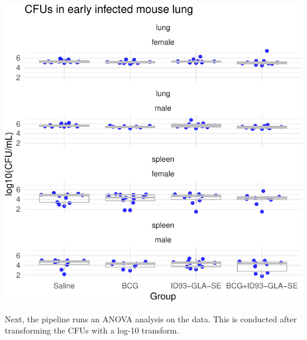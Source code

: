 \documentclass[
]{book}
\begin{document}
\includegraphics{csu-impactb_files/figure-latex/unnamed-chunk-32-1.pdf}

Next, the pipeline runs an ANOVA analysis on the data. This is conducted after
transforming the CFUs with a log-10 transform.
\end{document}
